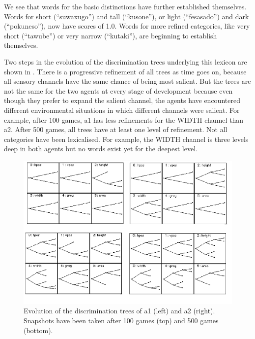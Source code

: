 We see that words for the basic distinctions have further established
themselves. Words for short (``suwaxugo'') and tall (``kusone''), or light (``fesasado'') and dark 
(``pokuneso''), now have scores of 1.0. Words for more refined categories, like very short (``tawube'') or 
very narrow (``kutaki''), are beginning to establish themselves.  

Two steps in the evolution of the discrimination trees
underlying this lexicon are shown in .
There is a progressive refinement 
of all trees as time goes on, 
because all sensory channels have the same chance
of being most salient. But the trees are not 
the same for the two agents at every stage
of development because even though they prefer to expand
the salient channel, the agents have encountered 
different environmental situations in which different
channels were salient. For example, after 100 
games, {\bfshape  a1} has less refinements for the 
WIDTH channel than {\bfshape  a2}. 
After 500 games, all trees 
have at least one level of refinement. Not all 
categories have been lexicalised. For example, the 
WIDTH channel is three levels deep in both 
agents but no words exist yet for the deepest 
level. 


\begin{figure}[htbp]
  \centerline{\includegraphics[width=.65\textwidth]{chap6/figs/gdis}}
\caption{\label{gdis1} Evolution of the discrimination
trees of {\bfshape  a1} (left) and {\bfshape  a2} (right).
Snapshots have been taken after 100 games (top) and 500 
games (bottom).} 
\end{figure}

